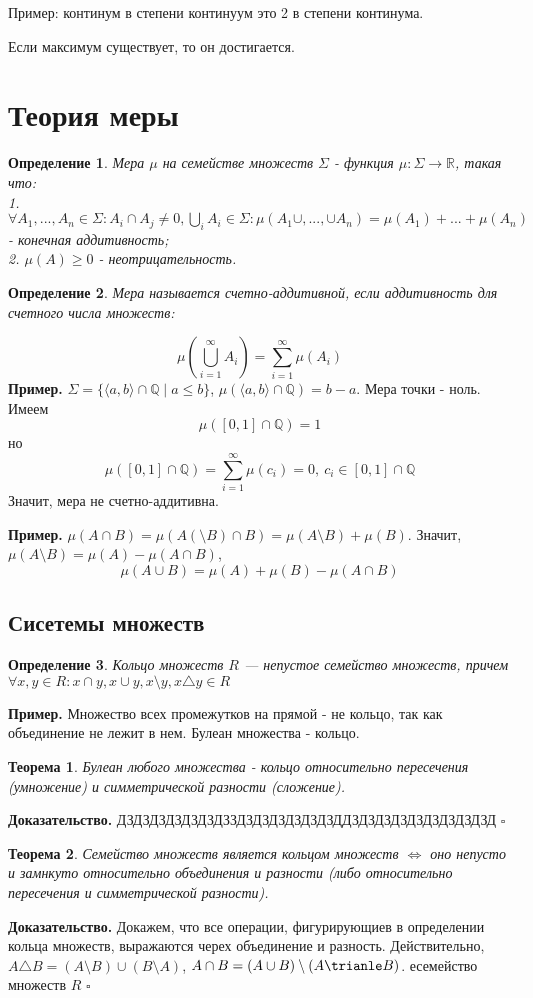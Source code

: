 \documentclass[a4paper]{article}
\newtheorem{defin}{Определение}
\newtheorem{theor}{Теорема}
\begin{document}
Пример: континум в степени континуум это 2 в степени континума. 

Если максимум существует, то он достигается. 

\newpage
\section{Теория меры}
\begin{defin}
Мера $\mu$ на семействе множеств  $\Sigma$ - функция  
$\mu\colon\Sigma\to\mathbb{R}$, такая что:\\
1. $\forall  A_1,...,A_n\in \Sigma:A_i\cap A_j\ne 0,\bigcup\limits_{i}A_i\in 
\Sigma:\mu(A_1\cup ,...,\cup A_n)=\mu(A_1)+...+\mu(A_n)$ -
конечная аддитивность;\\
2. $\mu(A)\geqslant 0$ - неотрицательность. 
\end{defin}
\begin{defin}
Мера называется счетно-аддитивной, если аддитивность для счетного числа 
множеств:
\end{defin}
$$\mu \left( \bigcup\limits_{i=1}^\infty A_i \right) = 
\sum\limits_{i=1}^{\infty} \mu(A_i)$$
\textbf{Пример.} $\Sigma = \{\langle a,b\rangle \cap \mathbb{Q}\mid 
a\leqslant b\}$, $\mu(\langle a,b\rangle \cap \mathbb{Q}) = b-a$. 
Мера точки - ноль. Имеем
$$\mu([0,1]\cap \mathbb{Q})=1$$ 
но
$$\mu([0,1]\cap \mathbb{Q}) = \sum\limits_{i=1}^{\infty}\mu(c_i)=0,~c_i\in 
[0,1]\cap \mathbb{Q}$$
 Значит, мера не счетно-аддитивна.

\textbf{Пример.} $\mu(A\cap B)=\mu(A(\setminus B)\cap B) = 
\mu(A\setminus B)+\mu(B)$. Значит, 
$\mu(A\setminus B)=\mu(A)-\mu(A\cap B)$, 
$$\mu(A\cup B) = \mu(A)+\mu(B)-\mu(A\cap B)$$

\subsection{Сисетемы множеств}
\begin{defin}
Кольцо множеств $R$ --- непустое семейство множеств, причем $\forall  x,y
\in R:x\cap y,x\cup y,x\setminus y, x\triangle y \in R$
\end{defin}
\textbf{Пример.} Множество всех промежутков на прямой - не кольцо, так как
объединение не лежит в нем. Булеан множества - кольцо.
\begin{theor}
Булеан любого множества - кольцо относительно пересечения (умножение)
и симметрической разности (сложение).
\end{theor}
\textbf{Доказательство.}  ДЗДЗДЗДЗДЗДЗДЗЗДЗДЗДЗДЗДЗДЗДДЗДЗДЗДЗДЗДЗДЗДЗДЗД
$\square$ \\
\begin{theor}
Семейство множеств является кольцом множеств $\Leftrightarrow$ оно 
непусто и замнкуто относительно объединения и разности (либо относительно 
пересечения и симметрической разности).
\end{theor}
\textbf{Доказательство.} Докажем, что все операции, фигурирующиев в 
определении кольца множеств, выражаются черех объединение и разность.
Действительно, $A\triangle B = (A\setminus B)\cup (B\setminus A)$,
$A\cap B = (A\cup B)\setminus (A\trianle B)$.
есемейство множеств $R$ $\square$ \\
\end{document}
